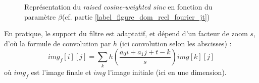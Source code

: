 	\begin{figure}
		\centering
		\caption{Représentation du \emph{raised cosine-weighted sinc} en fonction du paramètre $\beta$(cf. partie \ref{label_figure_dom_reel_fourier_jt})}
		\label{szeliski_plotRaisedCosine}
	\end{figure}
	
	En pratique, le support du filtre est adaptatif, et dépend d'un facteur de zoom $s$, d'où la formule de convolution par $h$ (ici convolution selon les abscisses) :
	\begin{equation}
	img_f[i][j] = \displaystyle{\sum_k}h\left(\frac{a_0i+a_1j+t-k}{s}\right)img[k][j]
	\label{formule_convolution_discrete}
	\end{equation}
	où $img_f$ est l'image finale et $img$ l'image initiale (ici en une dimension).
	
